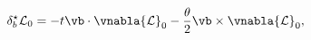 \begin{equation}
     \delta^{\star}_{b}{\cal L}_{0}=-t\vb\cdot\vnabla{\cal L}_{0}-
\frac{\theta}{2}\vb\times\vnabla{\cal L}_{0},
\label{newfreeactchange}
\end{equation}

